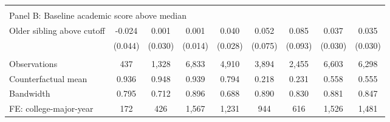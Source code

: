 {{\begin{tabular}{lcccccccc}
&  &  &  & & & & & &    \\
\multicolumn{9}{l}{Panel B: Baseline academic score above median} \\
Older sibling above cutoff&      -0.024   &       0.001   &       0.001   &       0.040   &       0.052   &       0.085   &       0.037   &       0.035   \\
                    &     (0.044)   &     (0.030)   &     (0.014)   &     (0.028)   &     (0.075)   &     (0.093)   &     (0.030)   &     (0.030)   \\
                    &               &               &               &               &               &               &               &               \\
Observations        &         437   &       1,328   &       6,833   &       4,910   &       3,894   &       2,455   &       6,603   &       6,298   \\
Counterfactual mean &       0.936   &       0.948   &       0.939   &       0.794   &       0.218   &       0.231   &       0.558   &       0.555   \\
Bandwidth           &       0.795   &       0.712   &       0.896   &       0.688   &       0.890   &       0.830   &       0.881   &       0.847   \\
FE: college-major-year&         172   &         426   &       1,567   &       1,231   &         944   &         616   &       1,526   &       1,481   \\
 

\bottomrule
\end{tabular}
}
}
